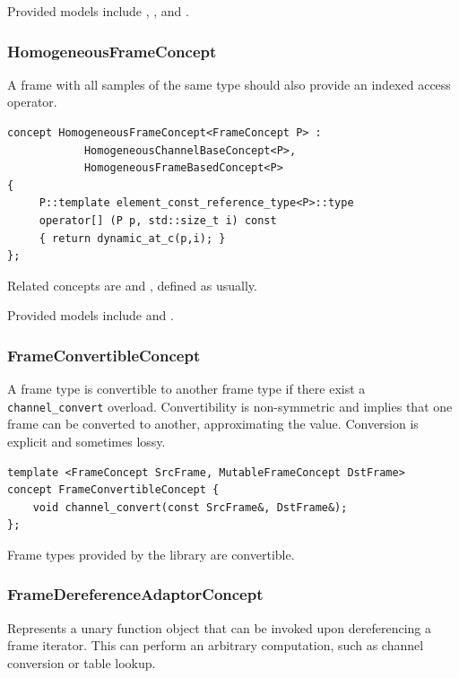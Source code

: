 Provided models include , ,
 and
.

\subsubsection{{HomogeneousFrameConcept}}

A frame with all samples of the same type should also provide an
indexed access operator.

\begin{lstlisting}
concept HomogeneousFrameConcept<FrameConcept P> :
            HomogeneousChannelBaseConcept<P>, 
            HomogeneousFrameBasedConcept<P> 
{ 
     P::template element_const_reference_type<P>::type 
     operator[] (P p, std::size_t i) const 
     { return dynamic_at_c(p,i); }
};
\end{lstlisting}

Related concepts are  and
, defined as usually.

Provided models include  and
.

\subsubsection{{FrameConvertibleConcept}}

A frame type is convertible to another frame type if there exist a
\texttt{channel\_convert} overload. Convertibility is non-symmetric
and implies that one frame can be converted to another, approximating
the value. Conversion is explicit and sometimes lossy.

\begin{lstlisting}
template <FrameConcept SrcFrame, MutableFrameConcept DstFrame>
concept FrameConvertibleConcept {
    void channel_convert(const SrcFrame&, DstFrame&);
};
\end{lstlisting}

Frame types provided by the library are convertible.

\subsubsection{{FrameDereferenceAdaptorConcept}}

Represents a unary function object that can be invoked upon
dereferencing a frame iterator. This can perform an arbitrary
computation, such as channel conversion or table lookup.


